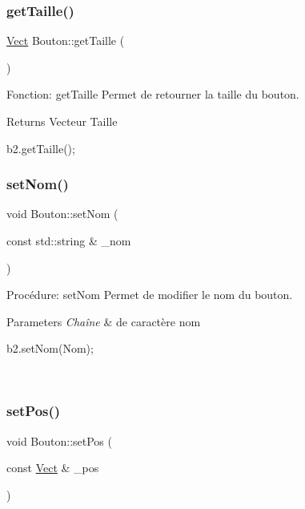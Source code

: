 \subsubsection{\texorpdfstring{get\+Taille()}{getTaille()}}
{\footnotesize\ttfamily \hyperlink{classVect}{Vect} Bouton\+::get\+Taille (\begin{DoxyParamCaption}{ }\end{DoxyParamCaption})}



Fonction\+: get\+Taille Permet de retourner la taille du bouton. 

\begin{DoxyReturn}{Returns}
Vecteur Taille 
\begin{DoxyCode}
b2.getTaille();
\end{DoxyCode}
 
\end{DoxyReturn}
\mbox{\label{classBouton_a4bdd74233fa0a3f6fe67d463b75d3f4a}} 
\subsubsection{\texorpdfstring{set\+Nom()}{setNom()}}
{\footnotesize\ttfamily void Bouton\+::set\+Nom (\begin{DoxyParamCaption}\item[{const std\+::string \&}]{\+\_\+nom }\end{DoxyParamCaption})}



Procédure\+: set\+Nom Permet de modifier le nom du bouton. 


\begin{DoxyParams}{Parameters}
{\em Chaîne} & de caractère nom 
\begin{DoxyCode}
b2.setNom(Nom);
\end{DoxyCode}
 \\
\hline
\end{DoxyParams}
\mbox{\label{classBouton_a393e195ff7d1ff7a5d3c79edc922b0cd}} 
\subsubsection{\texorpdfstring{set\+Pos()}{setPos()}}
{\footnotesize\ttfamily void Bouton\+::set\+Pos (\begin{DoxyParamCaption}\item[{const \hyperlink{classVect}{Vect} \&}]{\+\_\+pos }\end{DoxyParamCaption})}



